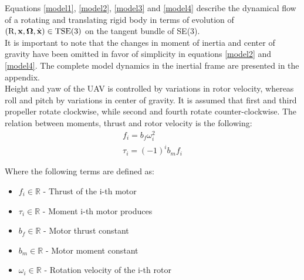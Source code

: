 \indent Equations \eqref{model1}, \ref{model2}, \ref{model3} and \ref{model4} describe the dynamical flow of a rotating and translating rigid body in terms of evolution of $(\text{R},\textbf{x},\boldsymbol{\Omega},\dot{\textbf{x}})\in \text{TSE}(3)$ on the tangent bundle of SE(3). \\
It is important to note that the changes in moment of inertia and center of gravity have been omitted in favor of simplicity in equations \ref{model2} and \ref{model4}. The complete model dynamics in the inertial frame are presented in the appendix.\\
\indent Height and yaw of the UAV is controlled by variations in rotor velocity, whereas roll and pitch by variations in center of gravity. It is assumed that first and third propeller rotate clockwise, while second and fourth rotate counter-clockwise. The relation between moments, thrust and rotor velocity is the following:
\begin{gather}
	f_i = b_f \omega_{i}^2 \label{force}\\
	\tau_i = (-1)^i b_m f_i
\end{gather}

\noindent Where the following terms are defined as:

\begin{itemize}
	\item $f_i \in \mathbb{R}$ - Thrust of the i-th motor
	
	\item $\tau_i \in \mathbb{R}$ - Moment i-th motor produces
	
	\item $b_f \in \mathbb{R}$ - Motor thrust constant
	
	\item $b_m \in \mathbb{R}$ - Motor moment constant
	
	\item $\omega_i \in \mathbb{R}$ - Rotation velocity of the i-th rotor
\end{itemize}

